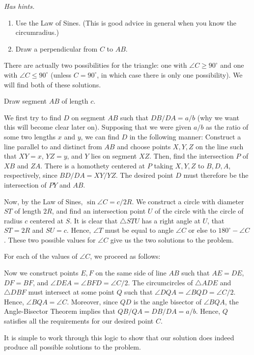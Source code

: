 \textit{Has hints.}
\begin{sketch}
    \begin{enumerate}
        \item Use the Law of Sines. (This is good advice in general when you know the circumradius.)
        \item Draw a perpendicular from $C$ to $AB$.
    \end{enumerate}
\end{sketch}

\begin{mdsoln}
    There are actually two possibilities for the triangle: one with $\angle C\ge 90^\circ$ and one with $\angle C\le 90^\circ$ (unless $C=90^\circ$, in which case there is only one possibility). We will find both of these solutions.

    Draw segment $AB$ of length $c$.
    
    We first try to find $D$ on segment $AB$ such that $DB/DA=a/b$ (why we want this will become clear later on). Supposing that we were given $a/b$ as the ratio of some two lengths $x$ and $y$, we can find $D$ in the following manner: Construct a line parallel to and distinct from $AB$ and choose points $X,Y,Z$ on the line such that $XY=x$, $YZ=y$, and $Y$ lies on segment $XZ$. Then, find the intersection $P$ of $XB$ and $ZA$. There is a homothety centered at $P$ taking $X,Y,Z$ to $B,D,A$, respectively, since $BD/DA=XY/YZ$. The desired point $D$ must therefore be the intersection of $PY$ and $AB$.
    
    Now, by the Law of Sines, $\sin \angle C=c/2R$. We construct a circle with diameter $ST$ of length $2R$, and find an intersection point $U$ of the circle with the circle of radius $c$ centered at $S$. It is clear that $\triangle STU$ has a right angle at $U$, that $ST=2R$ and $SU=c$. Hence, $\angle T$ must be equal to angle $\angle C$ or else to $180^\circ-\angle C$. These two possible values for $\angle C$ give us the two solutions to the problem.
    
    For each of the values of $\angle C$, we proceed as follows:
    
    Now we construct points $E,F$ on the same side of line $AB$ such that $AE=DE$, $DF=BF$, and $\angle DEA=\angle BFD=\angle C/2$. The circumcircles of $\triangle ADE$ and $\triangle DBF$ must intersect at some point $Q$ such that $\angle DQA=\angle BQD=\angle C/2$. Hence, $\angle BQA=\angle C$. Moreover, since $QD$ is the angle bisector of $\angle BQA$, the Angle-Bisector Theorem implies that $QB/QA=DB/DA=a/b$. Hence, $Q$ satisfies all the requirements for our desired point $C$.
    
    It is simple to work through this logic to show that our solution does indeed produce all possible solutions to the problem.        
\end{mdsoln}




